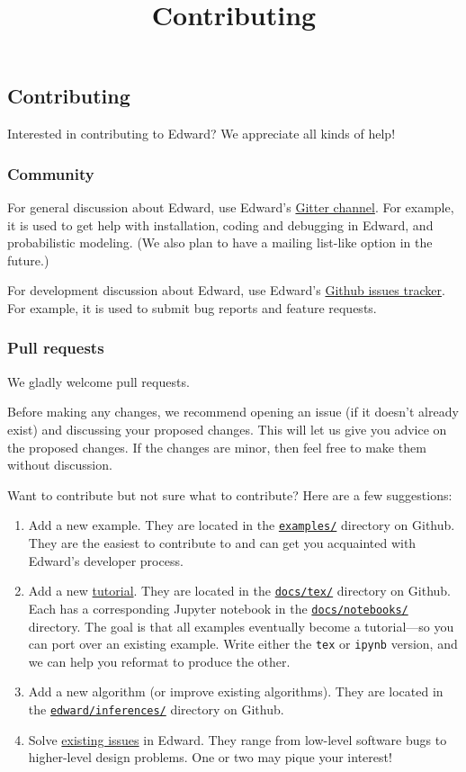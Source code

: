 \title{Contributing}

\subsection{Contributing}

Interested in contributing to Edward? We appreciate all kinds of help!

\subsubsection{Community}

For general discussion about Edward, use Edward's
\href{http://gitter.im/blei-lab/edward}{Gitter channel}.
For example, it is used to get help with installation, coding and
debugging in Edward, and probabilistic modeling.
(We also plan to have a mailing list-like option in the future.)

For development discussion about Edward, use Edward's
\href{https://github.com/blei-lab/edward/issues}{Github issues tracker}.
For example, it is used to submit bug reports and feature requests.

\subsubsection{Pull requests}

We gladly welcome pull requests.

Before making any changes, we recommend opening an issue (if it
doesn't already exist) and discussing your proposed changes. This will
let us give you advice on the proposed changes. If the changes are
minor, then feel free to make them without discussion.

Want to contribute but not sure what to contribute? Here are a few
suggestions:
\begin{enumerate}
\item
Add a new example.  They are located in the
\href{https://github.com/blei-lab/edward/tree/master/examples}
{\texttt{examples/}} directory on Github.
They are the easiest to contribute to and
can get you acquainted with Edward's developer process.
\item
Add a new \href{/tutorials}{tutorial}. They are located in the
\href{https://github.com/blei-lab/edward/tree/master/docs/tex}
{\texttt{docs/tex/}} directory on Github.
Each has a corresponding Jupyter notebook in the
\href{https://github.com/blei-lab/edward/tree/master/docs/notebooks}
{\texttt{docs/notebooks/}} directory.
The goal is that all examples eventually become a tutorial---so you
can port over an existing example. Write either the \texttt{tex} or
\texttt{ipynb} version, and we can help you reformat to produce the
other.
\item
Add a new algorithm (or improve existing algorithms).
They are located in the
\href{https://github.com/blei-lab/edward/tree/master/edward/inferences}
{\texttt{edward/inferences/}} directory on Github.
\item
Solve
\href{https://github.com/blei-lab/edward/issues}{existing issues}
in Edward. They range from low-level software bugs to higher-level
design problems.  One or two may pique your interest!
\end{enumerate}

